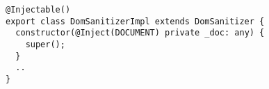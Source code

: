 \begin{verbatim}
@Injectable()
export class DomSanitizerImpl extends DomSanitizer {
  constructor(@Inject(DOCUMENT) private _doc: any) {
    super();
  }
  ..
}
\end{verbatim}
